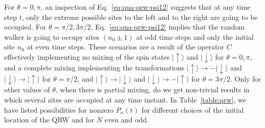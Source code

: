 \documentclass[12pt]{iopart}
\def\uarr{\uparrow}
\def\darr{\downarrow}
\def\ra{\rangle}
\begin{document}
For $\theta=0, \pi$, an inspection of Eq.~\eqref{eq:qua-qrw-psi12}
suggests that at any time step $t$, only the extreme possible sites to the left
and to the right are going to be occupied. For $\theta=\pi/2, 3\pi/2$,
Eq.~\eqref{eq:qua-qrw-psi12} implies that the random walker is going to
occupy sites $(n_0\pm 1)$ at odd time steps and only the initial site $n_0$ at
even time steps. These scenarios are a result of the operator $C$
effectively implementing no mixing of the spin states $|\uarr \ra$ and
$|\darr \ra$ for $\theta=0, \pi$, and a complete mixing implementing the
transformations $|\uarr \ra \to - |\darr \ra$ and $|\darr \ra \to |\uarr
\ra$ for $\theta = \pi/2$, and $|\uarr \ra \to |\darr \ra$ and $|\darr
\ra \to - |\uarr
\ra$ for $\theta =3\pi/2$. Only for other values of $\theta$, when there is partial mixing, do we get non-trivial results in which several sites are
occupied at any time instant. In
Table~\ref{table:qrw}, we have listed possibilities for nonzero $P_n(t)$ for different choices of the initial location of the
QRW and for $N$ even and odd.
\end{document}
